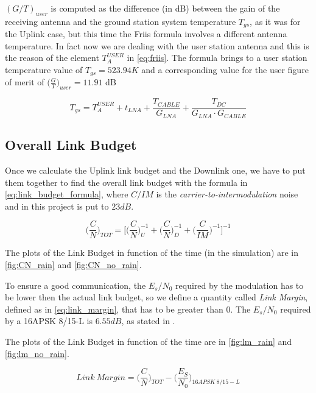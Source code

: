 	$(G/T)_{user}$ is computed as the difference (in dB) between the gain of the receiving antenna and the ground station system temperature $T_{gs}$, as it was for the Uplink case, but this time the Friis formula involves a different antenna temperature. In fact now we are dealing with the user station antenna and this is the reason of the element $T_A^{USER}$ in \autoref{eq:friis}. The formula brings to a user station temperature value of $T_{gs} = 523.94 K$ and a corresponding value for the user figure of merit of $\bigg(\frac{G}{T}\bigg)_{user} = 11.91$ dB

	\begin{equation}\label{eq:friis}
		T_{gs} = T_A^{USER} + t_{LNA} + \frac{T_{CABLE}}{G_{LNA}} + \frac{T_{DC}}{G_{LNA}\cdot G_{CABLE}}
	\end{equation}
\subsection{Overall Link Budget}
Once we calculate the Uplink link budget and the Downlink one, we have to put them together to find the overall link budget with the formula in \autoref{eq:link_budget_formula}, where $C/IM$ is the \textit{carrier-to-intermodulation} noise and in this project is put to $23dB$.

\begin{equation}\label{eq:link_budget_formula}
	\bigg(\frac{C}{N}\bigg)_{TOT} = \bigg[\bigg(\frac{C}{N}\bigg)^{-1}_U + \bigg(\frac{C}{N}\bigg)^{-1}_D + \bigg(\frac{C}{IM}\bigg)^{-1}\bigg]^{-1}
\end{equation}

The plots of the Link Budget in function of the time (in the simulation) are in	\autoref{fig:CN_rain} and \autoref{fig:CN_no_rain}.

To ensure a good communication, the $E_s/N_0$ required by the modulation has to be lower then the actual link budget, so we define a quantity called \textit{Link Margin}, defined as in \autoref{eq:link_margin}, that has to be greater than 0. The $E_s/N_0$ required by a 16APSK 8/15-L is $6.55dB$, as stated in \cite{dvbs2x}.

The plots of the Link Budget in function of the time are in	\autoref{fig:lm_rain} and \autoref{fig:lm_no_rain}.

\begin{equation}\label{eq:link_margin}
	Link ~Margin = \bigg(\frac{C}{N}\bigg)_{TOT} - \bigg(\frac{E_S}{N_0}\bigg)_{16APSK ~8/15-L}
\end{equation}

